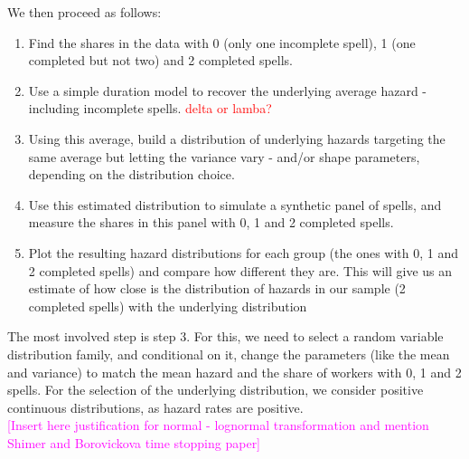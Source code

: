 \documentclass[12pt]{article}
\theoremstyle{definition}
\theoremstyle{remark}
\begin{document}
We then proceed as follows:
\begin{enumerate}
    \item Find the shares in the data with 0 (only one incomplete spell), 1 (one completed but not two) and 2 completed spells.
    \item Use a simple duration model to recover the underlying average hazard - including incomplete spells. \textcolor{red}{ delta or lamba?}
    \item Using this average, build a distribution of underlying hazards targeting the same average but letting the variance vary - and/or shape parameters, depending on the distribution choice.
    \item Use this estimated distribution to simulate a synthetic panel of spells, and measure the shares in this panel with 0, 1 and 2 completed spells.
    \item Plot the resulting hazard distributions for each group (the ones with 0, 1 and 2 completed spells) and compare how different they are. This will give us an estimate of how close is the distribution of hazards in our sample (2 completed spells) with the underlying distribution
\end{enumerate}

The most involved step is step 3. For this, we need to select a random variable distribution family, and conditional on it, change the parameters (like the mean and variance) to match the mean hazard and the share of workers with 0, 1 and 2 spells. For the selection of the underlying distribution, we consider positive continuous distributions, as hazard rates are positive. \\

\textcolor{magenta}{[Insert here justification for normal - lognormal transformation and mention Shimer and Borovickova time stopping paper]}\\






\end{document}
